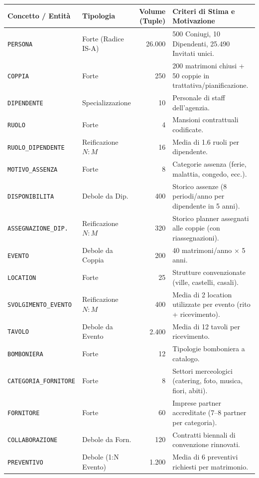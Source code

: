 \begin{table}[h!]
\centering
\small
\begin{tabularx}{\textwidth}{l p{2.5cm} r X}
\toprule
\textbf{Concetto / Entità} & \textbf{Tipologia} & \textbf{Volume (Tuple)} & \textbf{Criteri di Stima e Motivazione} \\
\midrule
\texttt{PERSONA} & Forte (Radice IS-A) & 26.000 & 500 Coniugi, 10 Dipendenti, 25.490 Invitati unici. \\
\texttt{COPPIA} & Forte & 250 & 200 matrimoni chiusi + 50 coppie in trattativa/pianificazione. \\
\texttt{DIPENDENTE} & Specializzazione & 10 & Personale di staff dell'agenzia. \\
\texttt{RUOLO} & Forte & 4 & Mansioni contrattuali codificate. \\
\texttt{RUOLO\_DIPENDENTE} & Reificazione $N:M$ & 16 & Media di 1.6 ruoli per dipendente. \\
\texttt{MOTIVO\_ASSENZA} & Forte & 8 & Categorie assenza (ferie, malattia, congedo, ecc.). \\
\texttt{DISPONIBILITA} & Debole da Dip. & 400 & Storico assenze (8 periodi/anno per dipendente in 5 anni). \\
\texttt{ASSEGNAZIONE\_DIP.} & Reificazione $N:M$ & 320 & Storico planner assegnati alle coppie (con riassegnazioni). \\
\texttt{EVENTO} & Debole da Coppia & 200 & 40 matrimoni/anno $\times$ 5 anni. \\
\texttt{LOCATION} & Forte & 25 & Strutture convenzionate (ville, castelli, casali). \\
\texttt{SVOLGIMENTO\_EVENTO}& Reificazione $N:M$ & 400 & Media di 2 location utilizzate per evento (rito + ricevimento). \\
\texttt{TAVOLO} & Debole da Evento & 2.400 & Media di 12 tavoli per ricevimento. \\
\texttt{BOMBONIERA} & Forte & 12 & Tipologie bomboniera a catalogo. \\
\texttt{CATEGORIA\_FORNITORE}& Forte & 8 & Settori merceologici (catering, foto, musica, fiori, abiti). \\
\texttt{FORNITORE} & Forte & 60 & Imprese partner accreditate (7--8 partner per categoria). \\
\texttt{COLLABORAZIONE} & Debole da Forn. & 120 & Contratti biennali di convenzione rinnovati. \\
\texttt{PREVENTIVO} & Debole (1:N Evento)& 1.200 & Media di 6 preventivi richiesti per matrimonio. \\

\end{tabularx}
\end{table}
